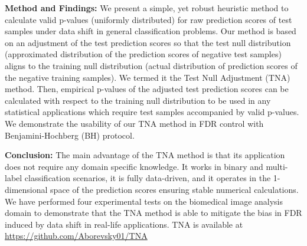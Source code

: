 \documentclass[10pt,letterpaper]{article}
\newcommand{\edit}[1]{#1} %
\begin{document}
\textbf{Method and Findings:} We present a simple, yet robust heuristic method to calculate valid p-values (uniformly distributed) for raw prediction scores of test samples under data shift in general classification problems.
Our method is based on an adjustment of the test prediction scores so that the test null distribution (approximated distribution of the prediction scores of negative test samples) aligns to the training null distribution (actual distribution of prediction scores of the negative training samples).
We termed it the Test Null Adjustment (TNA) method.
Then, empirical p-values of the adjusted test prediction scores can be calculated with respect to the training null distribution to be used in any statistical applications which require test samples accompanied by valid p-values.
We demonstrate the usability of our TNA method in FDR control with Benjamini-Hochberg (BH) protocol. 

\textbf{Conclusion:} The main advantage of the TNA method is that its application does not require any domain specific knowledge.
It works in binary and multi-label classification scenarios, it is fully data-driven, and it operates in the 1-dimensional space of the prediction scores ensuring stable numerical calculations.
We have performed four experimental tests on the biomedical image analysis domain to demonstrate that the TNA method is able to mitigate the bias in FDR induced by data shift in real-life applications. \edit{TNA is available at \url{https://github.com/Aborevsky01/TNA}}



%

\linenumbers

\end{document}
